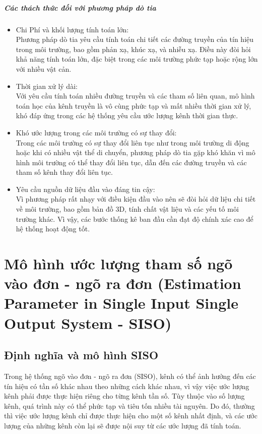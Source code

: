 \documentclass{article}
\begin{document}
\subparagraph{Các thách thức đối với phương pháp dò tia}
\begin{itemize}

    \item  Chi Phí và khối lượng tính toán lớn:\\
    Phương pháp dò tia yêu cầu tính toán chi tiết các đường truyền của tín hiệu trong môi trường, bao gồm phản xạ, khúc xạ, và nhiễu xạ. Điều này đòi hỏi khả năng tính toán lớn, đặc biệt trong các môi trường phức tạp hoặc rộng lớn với nhiều vật cản.
    
    \item  Thời gian xử lý dài:\\
    Với yêu cầu tính toán nhiều đường truyền và các tham số liên quan, mô hình toán học của kênh truyền là vô cùng phức tạp và mất nhiều thời gian xử lý, khó đáp ứng trong các hệ thống yêu cầu ước lượng kênh thời gian thực.

    \item  Khó ước lượng trong các môi trường có sự thay đổi:\\
    Trong các môi trường có sự thay đổi liên tục như trong môi trường di động hoặc khi có nhiều vật thể di chuyển, phương pháp dò tia gặp khó khăn vì mô hình môi trường có thể thay đổi liên tục, dẫn đến các đường truyền và các tham số kênh thay đổi liên tục.

    \item  Yêu cầu nguồn dữ liệu đầu vào đáng tin cậy:\\
    Vì phương pháp rất nhạy với điều kiện đầu vào nên sẽ đòi hỏi dữ liệu chi tiết về môi trường, bao gồm bản đồ 3D, tính chất vật liệu và các yếu tố môi trường khác. Vì vậy, các bước thống kê ban đầu cần đạt độ chính xác cao để hệ thống hoạt động tốt.
\end{itemize}
\section{Mô hình ước lượng tham số ngõ vào đơn - ngõ ra đơn (Estimation Parameter in Single Input Single Output System - SISO)}

\subsection{Định nghĩa và mô hình SISO}

Trong hệ thống ngõ vào đơn - ngõ ra đơn (SISO), kênh có thể ảnh hưởng đến các tín hiệu có tần số khác nhau theo những cách khác nhau, vì vậy việc ước lượng kênh phải được thực hiện riêng cho từng kênh tần số. Tùy thuộc vào số lượng kênh, quá trình này có thể phức tạp và tiêu tốn nhiều tài nguyên. Do đó, thường thì việc ước lượng kênh chỉ được thực hiện cho một số kênh nhất định, và các ước lượng của những kênh còn lại sẽ được nội suy từ các ước lượng đã tính toán.\\
\end{document}
